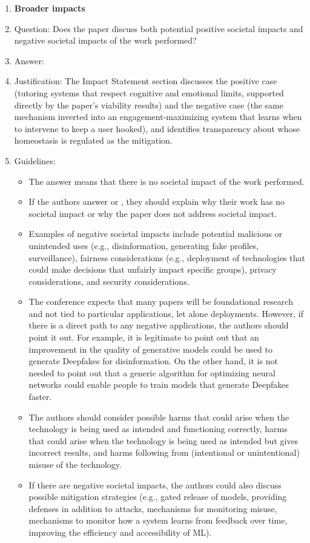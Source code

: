 \begin{enumerate}
\item {\bf Broader impacts}
    \item[] Question: Does the paper discuss both potential positive societal impacts and negative societal impacts of the work performed?
    \item[] Answer: \answerYes{}
    \item[] Justification: The Impact Statement section discusses the positive case (tutoring systems that respect cognitive and emotional limits, supported directly by the paper's viability results) and the negative case (the same mechanism inverted into an engagement-maximizing system that learns when to intervene to keep a user hooked), and identifies transparency about whose homeostasis is regulated as the mitigation.
    \item[] Guidelines:
    \begin{itemize}
        \item The answer \answerNA{} means that there is no societal impact of the work performed.
        \item If the authors answer \answerNA{} or \answerNo, they should explain why their work has no societal impact or why the paper does not address societal impact.
        \item Examples of negative societal impacts include potential malicious or unintended uses (e.g., disinformation, generating fake profiles, surveillance), fairness considerations (e.g., deployment of technologies that could make decisions that unfairly impact specific groups), privacy considerations, and security considerations.
        \item The conference expects that many papers will be foundational research and not tied to particular applications, let alone deployments. However, if there is a direct path to any negative applications, the authors should point it out. For example, it is legitimate to point out that an improvement in the quality of generative models could be used to generate Deepfakes for disinformation. On the other hand, it is not needed to point out that a generic algorithm for optimizing neural networks could enable people to train models that generate Deepfakes faster.
        \item The authors should consider possible harms that could arise when the technology is being used as intended and functioning correctly, harms that could arise when the technology is being used as intended but gives incorrect results, and harms following from (intentional or unintentional) misuse of the technology.
        \item If there are negative societal impacts, the authors could also discuss possible mitigation strategies (e.g., gated release of models, providing defenses in addition to attacks, mechanisms for monitoring misuse, mechanisms to monitor how a system learns from feedback over time, improving the efficiency and accessibility of ML).
    \end{itemize}
    

\end{enumerate}

